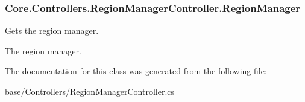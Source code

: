 \subsubsection[{Region\+Manager}]{ Core.\+Controllers.\+Region\+Manager\+Controller.\+Region\+Manager\hspace{0.3cm}{\ttfamily [get]}}\label{classCore_1_1Controllers_1_1RegionManagerController_a083ddefab3d734121ca256919bffa097}


Gets the region manager. 

The region manager.

The documentation for this class was generated from the following file\+:\begin{DoxyCompactItemize}
\item 
base/\+Controllers/Region\+Manager\+Controller.\+cs\end{DoxyCompactItemize}
